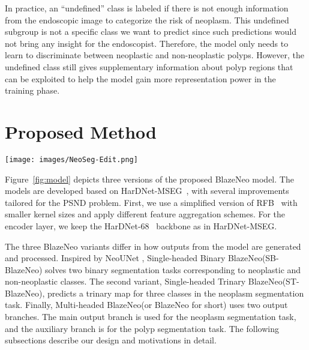 \documentclass{ieeeaccess}
\newcommand{\ModelName}{BlazeNeo\xspace}
\begin{document}
In practice, an ``undefined'' class is labeled if there is not enough information from the endoscopic image to categorize the risk of neoplasm. This undefined subgroup is not a specific class we want to predict since such predictions would not bring any insight for the endoscopist. Therefore, the model only needs to learn to discriminate between neoplastic and non-neoplastic polyps. However, the undefined class still gives supplementary information about polyp regions that can be exploited to help the model gain more representation power in the training phase.




\section{Proposed Method}
\label{sec:propose}

\begin{figure*}[ht!]
    \begin{center}
        \texttt{[image: images/NeoSeg-Edit.png]}
    \end{center}
    \caption{Proposed architectures of our \ModelName: (a) Single-headed Binary BlazeNeo (SB-BlazeNeo) has one output branch that produces two binary segmentation maps corresponding to neoplastic and non-neoplastic classes; (b) Single-headed Trinary BlazeNeo (ST-BlazeNeo) also has one output branch that directly predicts a trinary segmentation map; (c) Multi-headed BlazeNeo (or BlazeNeo for short) contains two output branches that are responsible for the two tasks: neoplasm segmentation treated as the main task, and polyp segmentation treated as the auxiliary task. Both branches share the same architecture of the feature aggregation module, but they are trained separately without sharing their parameters.}
    \label{fig:model}
\end{figure*}

Figure~\ref{fig:model} depicts three versions of the proposed \ModelName model. The models are developed based on HarDNet-MSEG~\cite{huang2021hardnet}, with several improvements tailored for the PSND problem. First, we use a simplified version of RFB~\cite{liu2018receptive} with smaller kernel sizes and apply different feature aggregation schemes. For the encoder layer, we keep the HarDNet-68~\cite{chao2019hardnet} backbone as in HarDNet-MSEG.

The three \ModelName variants differ in how outputs from the model are generated and processed. Inspired by NeoUNet \cite{lan2021neounet}, Single-headed Binary \ModelName (SB-\ModelName) solves two binary segmentation tasks corresponding to neoplastic and non-neoplastic classes.
The second variant, Single-headed Trinary \ModelName (ST-\ModelName), predicts a trinary map for three classes in the neoplasm segmentation task. Finally, Multi-headed \ModelName (or \ModelName for short) uses two output branches. The main output branch is used for the neoplasm segmentation task, and the auxiliary branch is for the polyp segmentation task. The following subsections describe our design and motivations in detail.
\end{document}
